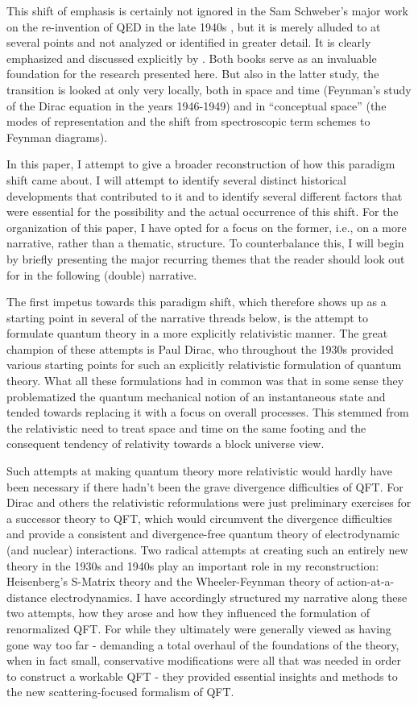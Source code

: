 \documentclass[12pt]{article}
\begin{document}
This shift of emphasis is certainly not ignored in the Sam Schweber's major work on the re-invention of QED in the late 1940s \citep{schweber_1994_qed}, but it is merely alluded to at several points and not analyzed or identified in greater detail. It is clearly emphasized and discussed explicitly by  \cite{wuethrich_2010_the-genesis}. Both books serve as an invaluable foundation for the research presented here. But also in the latter study, the transition is looked at only very locally, both in space and time (Feynman's study of the Dirac equation in the years 1946-1949) and in ``conceptual space'' (the modes of representation and the shift from spectroscopic term schemes to Feynman diagrams).

In this paper, I attempt to give a broader reconstruction of how this paradigm shift came about. I will attempt to identify several distinct historical developments that contributed to it and to identify several different factors that were essential for the possibility and the actual occurrence of this shift. For the organization of this paper, I have opted for a focus on the former, i.e., on a more narrative, rather than a thematic, structure. To counterbalance this, I will begin by briefly presenting the major recurring themes that the reader should look out for in the following (double) narrative.

The first impetus towards this paradigm shift, which therefore shows up as a starting point in several of the narrative threads below, is the attempt to formulate quantum theory in a more explicitly relativistic manner. The great champion of these attempts is Paul Dirac, who throughout the 1930s provided various starting points for such an explicitly relativistic formulation of quantum theory. What all these formulations had in common was that in some sense they problematized the quantum mechanical notion of an instantaneous state and tended towards replacing it with a focus on overall processes. This stemmed from the relativistic need to treat space and time on the same footing and the consequent tendency of relativity towards a block universe view.

Such attempts at making quantum theory more relativistic would hardly have been necessary if there hadn't been the grave divergence difficulties of QFT. For Dirac and others the relativistic reformulations were just preliminary exercises for a successor theory to QFT, which would circumvent the divergence difficulties and provide a consistent and divergence-free quantum theory of electrodynamic (and nuclear) interactions. Two radical attempts at creating such an entirely new theory  in the 1930s and 1940s play an important role in my reconstruction: Heisenberg's S-Matrix theory and the Wheeler-Feynman theory of action-at-a-distance electrodynamics. I have accordingly structured my narrative along these two attempts, how they arose and how they influenced the formulation of renormalized QFT. For while they ultimately were generally viewed as having gone way too far - demanding a total overhaul of the foundations of the theory, when in fact small, conservative modifications were all that was needed in order to construct a workable QFT - they provided essential insights and methods to the new scattering-focused formalism of QFT.
\end{document}
